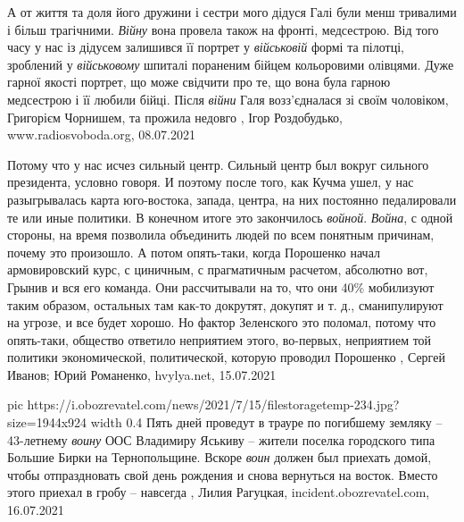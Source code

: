 А от життя та доля його дружини і сестри мого дідуся Галі були менш тривалими і
більш трагічними. \emph{Війну} вона провела також на фронті, медсестрою. Від того часу
у нас із дідусем залишився її портрет у \emph{військовій} формі та пілотці, зроблений
у \emph{військовому} шпиталі пораненим бійцем кольоровими олівцями. Дуже гарної якості
портрет, що може свідчити про те, що вона була гарною медсестрою і її любили
бійці. Після \emph{війни} Галя возз’єдналася зі своїм чоловіком, Григорієм Чорнишем,
та прожила недовго
, 
Ігор Роздобудько, www.radiosvoboda.org, 08.07.2021

Потому что у нас исчез сильный центр. Сильный центр был вокруг сильного
президента, условно говоря. И поэтому после того, как Кучма ушел, у нас
разыгрывалась карта юго-востока, запада, центра, на них постоянно педалировали
те или иные политики. В конечном итоге это закончилось \emph{войной}.
\emph{Война}, с одной стороны, на время позволила объединить людей по всем
понятным причинам, почему это произошло. А потом опять-таки, когда Порошенко
начал армовировский курс, с циничным, с прагматичным расчетом, абсолютно вот,
Грынив и вся его команда. Они рассчитывали на то, что они 40\% мобилизуют таким
образом, остальных там как-то докрутят, докупят и т. д., сманипулируют на
угрозе, и все будет хорошо. Но фактор Зеленского это поломал, потому что
опять-таки, общество ответило неприятием этого, во-первых, неприятием той
политики экономической, политической, которую проводил Порошенко
, 
Сергей Иванов; Юрий Романенко, hvylya.net, 15.07.2021

\ifcmt
  pic https://i.obozrevatel.com/news/2021/7/15/filestoragetemp-234.jpg?size=1944x924
  width 0.4
\fi
Пять дней проведут в трауре по погибшему земляку – 43-летнему \emph{воину} ООС
Владимиру Яськиву – жители поселка городского типа Большие Бирки на
Тернопольщине. Вскоре \emph{воин} должен был приехать домой, чтобы отпраздновать свой
день рождения и снова вернуться на восток. Вместо этого приехал в гробу –
навсегда
, 
Лилия Рагуцкая, incident.obozrevatel.com, 16.07.2021


